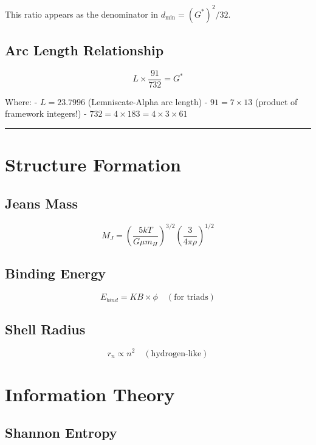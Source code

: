 \documentclass[
  11pt,
  letterpaper,
  twoside,
  openright]{book}
\begin{document}
This ratio appears as the denominator in \(d_{\min} = (G^*)^2/32\).

\subsection{Arc Length Relationship}\label{arc-length-relationship}

\[
L \times \frac{91}{732} = G^*
\]

Where: - \(L = 23.7996\) (Lemniscate-Alpha arc length) -
\(91 = 7 \times 13\) (product of framework integers!) -
\(732 = 4 \times 183 = 4 \times 3 \times 61\)

\begin{center}\rule{0.5\linewidth}{0.5pt}\end{center}

\section{Structure Formation}\label{structure-formation-1}

\subsection{Jeans Mass}\label{jeans-mass}

\[
M_J = \left(\frac{5kT}{G\mu m_H}\right)^{3/2} \left(\frac{3}{4\pi\rho}\right)^{1/2}
\]

\subsection{Binding Energy}\label{binding-energy-2}

\[
E_{bind} = KB \times \phi \quad (\text{for triads})
\]

\subsection{Shell Radius}\label{shell-radius}

\[
r_n \propto n^2 \quad (\text{hydrogen-like})
\]

\section{Information Theory}\label{information-theory}

\subsection{Shannon Entropy}\label{shannon-entropy-1}
\end{document}
